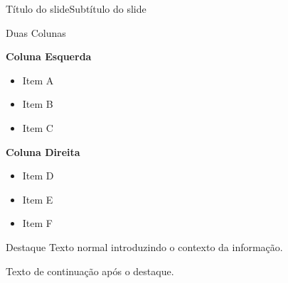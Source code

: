 \begin{frame}{Título do slide}{Subtítulo do slide}
    \lipsum[1]
\end{frame}

\begin{frame}{Duas Colunas}{}
    \begin{lidtwocol}
        \textbf{Coluna Esquerda}
        \begin{itemize}
            \item Item A
            \item Item B
            \item Item C
        \end{itemize}
    \lidnextcol
        \textbf{Coluna Direita}
        \begin{itemize}
            \item Item D
            \item Item E
            \item Item F
        \end{itemize}
    \end{lidtwocol}
\end{frame}

\begin{frame}{Destaque}{}
    Texto normal introduzindo o contexto da informação.

    \vspace{0.5em}
    \vspace{0.5em}

    Texto de continuação após o destaque.
\end{frame}
